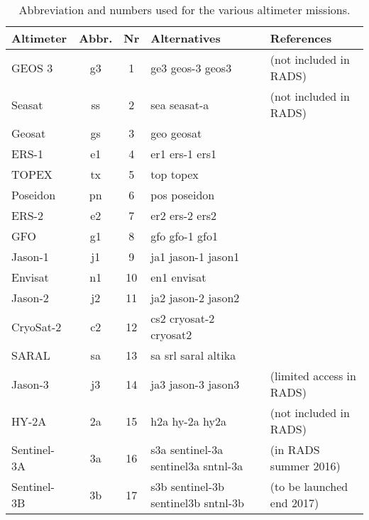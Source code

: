 \begin{table}
\begin{tabular}{lccll}
\hline
Altimeter & Abbr. & Nr & Alternatives & References \\
\hline
GEOS 3      & g3 &  1 & ge3 geos-3 geos3                    & (not included in RADS) \\
Seasat      & ss &  2 & sea seasat-a                        & (not included in RADS) \\
Geosat      & gs &  3 & geo geosat                          & \\
ERS-1       & e1 &  4 & er1 ers-1 ers1                      & \citep{francis1990a,francis1991a} \\
TOPEX       & tx &  5 & top topex                           & \citep{fu1994} \\
Poseidon    & pn &  6 & pos poseidon                        & \\
ERS-2       & e2 &  7 & er2 ers-2 ers2                      & \citep{francis1995a} \\
GFO         & g1 &  8 & gfo gfo-1 gfo1                      & \\
Jason-1     & j1 &  9 & ja1 jason-1 jason1                  & \citep{menard2003} \\
Envisat     & n1 & 10 & en1 envisat                         & \\
Jason-2     & j2 & 11 & ja2 jason-2 jason2                  & \citep{lambin2010} \\
CryoSat-2   & c2 & 12 & cs2 cryosat-2 cryosat2              & \citep{wingham2006} \\
SARAL       & sa & 13 & sa srl saral altika                 & \\
Jason-3     & j3 & 14 & ja3 jason-3 jason3                  & (limited access in RADS) \\
HY-2A       & 2a & 15 & h2a hy-2a hy2a                      & (not included in RADS) \\
Sentinel-3A & 3a & 16 & s3a sentinel-3a sentinel3a sntnl-3a & (in RADS summer 2016) \\
Sentinel-3B & 3b & 17 & s3b sentinel-3b sentinel3b sntnl-3b & (to be launched end 2017) \\
\hline
\end{tabular}
\caption{Abbreviation and numbers used for the various altimeter missions.}
\label{tab:rads4_sats}
\end{table}
